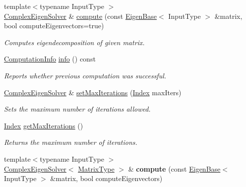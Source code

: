 \begin{DoxyCompactItemize}
{\footnotesize template$<$typename Input\+Type $>$ }\\\mbox{\hyperlink{class_eigen_1_1_complex_eigen_solver}{Complex\+Eigen\+Solver}} \& \mbox{\hyperlink{class_eigen_1_1_complex_eigen_solver_aeb7e38c6db5369f5c974f3786e94c1f0}{compute}} (const \mbox{\hyperlink{struct_eigen_1_1_eigen_base}{Eigen\+Base}}$<$ Input\+Type $>$ \&matrix, bool compute\+Eigenvectors=true)
\begin{DoxyCompactList}\small\item\em Computes eigendecomposition of given matrix. \end{DoxyCompactList}\item 
\mbox{\hyperlink{group__enums_ga85fad7b87587764e5cf6b513a9e0ee5e}{Computation\+Info}} \mbox{\hyperlink{class_eigen_1_1_complex_eigen_solver_ad4d9d8b90145900b9686d2dabbe46730}{info}} () const
\begin{DoxyCompactList}\small\item\em Reports whether previous computation was successful. \end{DoxyCompactList}\item 
\mbox{\label{class_eigen_1_1_complex_eigen_solver_a0c5a974da17774d75be41e351e6bda62}} 
\mbox{\hyperlink{class_eigen_1_1_complex_eigen_solver}{Complex\+Eigen\+Solver}} \& \mbox{\hyperlink{class_eigen_1_1_complex_eigen_solver_a0c5a974da17774d75be41e351e6bda62}{set\+Max\+Iterations}} (\mbox{\hyperlink{class_eigen_1_1_complex_eigen_solver_abc0218d8b902af0d6c759bfc0a8a8d74}{Index}} max\+Iters)
\begin{DoxyCompactList}\small\item\em Sets the maximum number of iterations allowed. \end{DoxyCompactList}\item 
\mbox{\label{class_eigen_1_1_complex_eigen_solver_aeec4754e32bf2d1c650bf3aed110c3d3}} 
\mbox{\hyperlink{class_eigen_1_1_complex_eigen_solver_abc0218d8b902af0d6c759bfc0a8a8d74}{Index}} \mbox{\hyperlink{class_eigen_1_1_complex_eigen_solver_aeec4754e32bf2d1c650bf3aed110c3d3}{get\+Max\+Iterations}} ()
\begin{DoxyCompactList}\small\item\em Returns the maximum number of iterations. \end{DoxyCompactList}\item 
\mbox{\label{class_eigen_1_1_complex_eigen_solver_a077a28fcef2f7eecb6041380cfcd83fd}} 
{\footnotesize template$<$typename Input\+Type $>$ }\\\mbox{\hyperlink{class_eigen_1_1_complex_eigen_solver}{Complex\+Eigen\+Solver}}$<$ \mbox{\hyperlink{class_eigen_1_1_complex_eigen_solver_ad61f6278843a601096276c9a72c0252f}{Matrix\+Type}} $>$ \& {\bfseries compute} (const \mbox{\hyperlink{struct_eigen_1_1_eigen_base}{Eigen\+Base}}$<$ Input\+Type $>$ \&matrix, bool compute\+Eigenvectors)
\end{DoxyCompactItemize}
